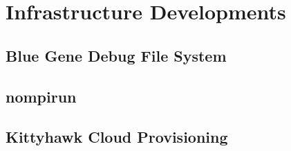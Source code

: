 \chapter{Infrastructure Developments}
\section{Blue Gene Debug File System}
\section{nompirun}
\section{Kittyhawk Cloud Provisioning}
